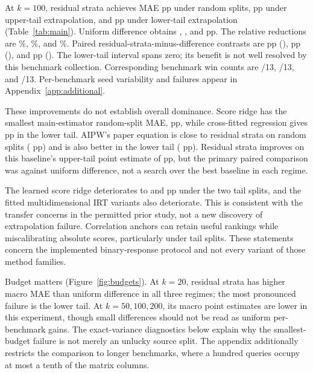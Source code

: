 At $k=100$, residual strata achieves MAE \RandomResidualStrataMae{} pp under random splits, \UpperResidualStrataMae{} pp under upper-tail extrapolation, and \LowerResidualStrataMae{} pp under lower-tail extrapolation (Table~\ref{tab:main}). Uniform difference obtains \RandomDifferenceMae{}, \UpperDifferenceMae{}, and \LowerDifferenceMae{} pp. The relative reductions are \RandomGain\%, \UpperGain\%, and \LowerGain\%. Paired residual-strata-minus-difference contrasts are \RandomDelta{} pp (\RandomDeltaCI), \UpperDelta{} pp (\UpperDeltaCI), and \LowerDelta{} pp (\LowerDeltaCI). The lower-tail interval spans zero; its benefit is not well resolved by this benchmark collection. Corresponding benchmark win counts are \RandomWins/13, \UpperWins/13, and \LowerWins/13. Per-benchmark seed variability and failures appear in Appendix~\ref{app:additional}.

These improvements do not establish overall dominance. Score ridge has the smallest main-estimator random-split MAE, \RandomRidgeMae{} pp, while cross-fitted regression gives \LowerCfRegressionMae{} pp in the lower tail. AIPW's paper equation is close to residual strata on random splits (\RandomAipwPaperMae{} pp) and is also better in the lower tail (\LowerAipwPaperMae{} pp). Residual strata improves on this baseline's upper-tail point estimate of \UpperAipwPaperMae{} pp, but the primary paired comparison was against uniform difference, not a search over the best baseline in each regime.

The learned score ridge deteriorates to \UpperRidgeMae{} and \LowerRidgeMae{} pp under the two tail splits, and the fitted multidimensional IRT variants also deteriorate. This is consistent with the transfer concerns in the permitted prior study, not a new discovery of extrapolation failure. Correlation anchors can retain useful rankings while miscalibrating absolute scores, particularly under tail splits. These statements concern the implemented binary-response protocol and not every variant of those method families.

Budget matters (Figure~\ref{fig:budgets}). At $k=20$, residual strata has higher macro MAE than uniform difference in all three regimes; the most pronounced failure is the lower tail. At $k=50,100,200$, its macro point estimates are lower in this experiment, though small differences should not be read as uniform per-benchmark gains. The exact-variance diagnostics below explain why the smallest-budget failure is not merely an unlucky source split. The appendix additionally restricts the comparison to longer benchmarks, where a hundred queries occupy at most a tenth of the matrix columns.
